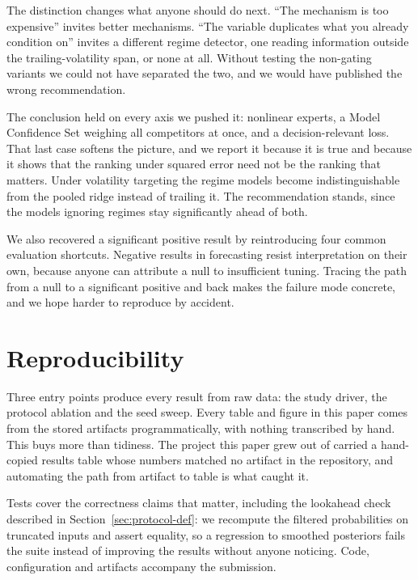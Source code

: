 \documentclass[sigconf,nonacm]{acmart}
\begin{document}
The distinction changes what anyone should do next. ``The mechanism is too
expensive'' invites better mechanisms. ``The variable duplicates what you already
condition on'' invites a different regime detector, one reading information
outside the trailing-volatility span, or none at all. Without testing the
non-gating variants we could not have separated the two, and we would have
published the wrong recommendation.

The conclusion held on every axis we pushed it: nonlinear experts, a Model
Confidence Set weighing all competitors at once, and a decision-relevant loss.
That last case softens the picture, and we report it because it is true and
because it shows that the ranking under squared error need not be the ranking
that matters. Under volatility targeting the regime models become
indistinguishable from the pooled ridge instead of trailing it. The
recommendation stands, since the models ignoring regimes stay significantly ahead
of both.

We also recovered a significant positive result by reintroducing four common
evaluation shortcuts. Negative results in forecasting resist interpretation on
their own, because anyone can attribute a null to insufficient tuning. Tracing
the path from a null to a significant positive and back makes the failure mode
concrete, and we hope harder to reproduce by accident.

\section*{Reproducibility}

Three entry points produce every result from raw data: the study driver, the
protocol ablation and the seed sweep. Every table and figure in this paper comes
from the stored artifacts programmatically, with nothing transcribed by hand.
This buys more than tidiness. The project this paper grew out of carried a
hand-copied results table whose numbers matched no artifact in the repository,
and automating the path from artifact to table is what caught it.

Tests cover the correctness claims that matter, including the lookahead check
described in Section~\ref{sec:protocol-def}: we recompute the filtered
probabilities on truncated inputs and assert equality, so a regression to
smoothed posteriors fails the suite instead of improving the results without
anyone noticing. Code, configuration and artifacts accompany the submission.


\appendix
\end{document}
